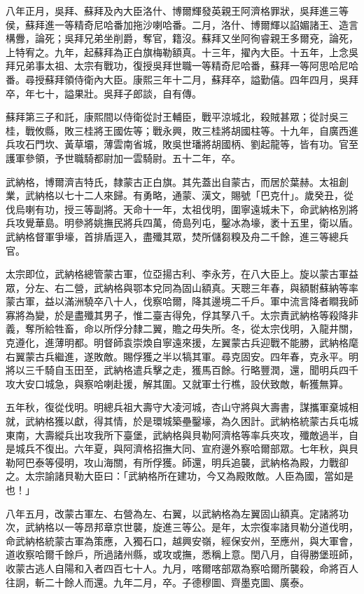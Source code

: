 \begin{pinyinscope}
八年正月，吳拜、蘇拜及內大臣洛什、博爾輝發英親王阿濟格罪狀，吳拜進三等侯，蘇拜進一等精奇尼哈番加拖沙喇哈番。二月，洛什、博爾輝以諂媚諸王、造言構釁，論死；吳拜兄弟坐削爵，奪官，籍沒。蘇拜又坐阿徇睿親王多爾兗，論死，上特宥之。九年，起蘇拜為正白旗梅勒額真。十三年，擢內大臣。十五年，上念吳拜兄弟事太祖、太宗有戰功，復授吳拜世職一等精奇尼哈番，蘇拜一等阿思哈尼哈番。尋授蘇拜領侍衛內大臣。康熙三年十二月，蘇拜卒，謚勤僖。四年四月，吳拜卒，年七十，謚果壯。吳拜子郎談，自有傳。

蘇拜第三子和託，康熙間以侍衛從討王輔臣，戰平涼城北，殺賊甚眾；從討吳三桂，戰攸縣，敗三桂將王國佐等；戰永興，敗三桂將胡國柱等。十九年，自廣西進兵攻石門坎、黃草壩，薄雲南省城，敗吳世璠將胡國柄、劉起龍等，皆有功。官至護軍參領，予世職騎都尉加一雲騎尉。五十二年，卒。

武納格，博爾濟吉特氏，隸蒙古正白旗。其先蓋出自蒙古，而居於葉赫。太祖創業，武納格以七十二人來歸。有勇略，通蒙、漢文，賜號「巴克什」。歲癸丑，從伐烏喇有功，授三等副將。天命十一年，太祖伐明，圍寧遠城未下，命武納格別將兵攻覺華島。明參將姚撫民將兵四萬，倚島列屯，鑿冰為壕，袤十五里，衛以盾。武納格督軍爭壕，首排盾逕入，盡殲其眾，焚所儲芻糗及舟二千餘，進三等總兵官。

太宗即位，武納格總管蒙古軍，位亞揚古利、李永芳，在八大臣上。旋以蒙古軍益眾，分左、右二營，武納格與鄂本兌同為固山額真。天聰三年春，與額駙蘇納等率蒙古軍，益以滿洲驍卒八十人，伐察哈爾，降其邊境二千戶。軍中流言降者瞷我師寡將為變，於是盡殲其男子，惟二臺吉得免，俘其孥八千。太宗責武納格等殺降非義，奪所給牲畜，命以所俘分隸二翼，贍之毋失所。冬，從太宗伐明，入龍井關，克遵化，進薄明都。明督師袁崇煥自寧遠來援，左翼蒙古兵迎戰不能勝，武納格麾右翼蒙古兵繼進，遂敗敵。賜俘獲之半以犒其軍。尋克固安。四年春，克永平。明將以三千騎自玉田至，武納格遣兵擊之走，獲馬百餘。行略豐潤，還，聞明兵四千攻大安口城急，與察哈喇赴援，解其圍。又就軍士行樵，設伏致敵，斬獲無算。

五年秋，復從伐明。明總兵祖大壽守大凌河城，杏山守將與大壽書，謀攜軍棄城相就，武納格獲以獻，得其情，於是環城築壘鑿壕，為久困計。武納格統蒙古兵屯城東南，大壽縱兵出攻我所下臺堡，武納格與貝勒阿濟格等率兵夾攻，殲敵過半，自是城兵不復出。六年夏，與阿濟格招撫大同、宣府邊外察哈爾部眾。七年秋，與貝勒阿巴泰等侵明，攻山海關，有所俘獲。師還，明兵追襲，武納格為殿，力戰卻之。太宗諭諸貝勒大臣曰：「武納格所在建功，今又為殿敗敵。人臣為國，當如是也！」

八年五月，改蒙古軍左、右營為左、右翼，以武納格為左翼固山額真。定諸將功次，武納格以一等昂邦章京世襲，旋進三等公。是年，太宗復率諸貝勒分道伐明，命武納格統蒙古軍為策應，入獨石口，越興安嶺，經保安州，至應州，與大軍會，道收察哈爾千餘戶，所過諸州縣，或攻或撫，悉稱上意。閏八月，自得勝堡班師，收蒙古逃人自陽和入者四百七十人。九月，喀爾喀部眾為察哈爾所襲殺，命將百人往詗，斬二十餘人而還。九年二月，卒。子德穆圖、齊墨克圖、廣泰。


\end{pinyinscope}
